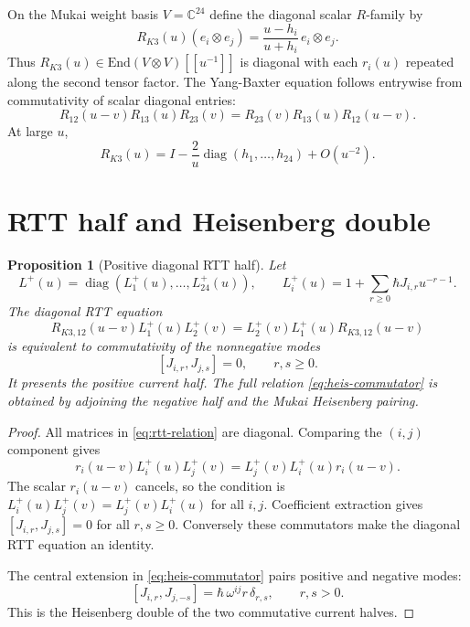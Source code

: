 \documentclass[11pt]{article}
\newtheorem{proposition}[theorem]{Proposition}
\theoremstyle{definition}
\newcommand{\C}{\mathbb{C}}
\newcommand{\End}{\mathrm{End}}
\begin{document}
On the Mukai weight basis $V=\C^{24}$ define the diagonal scalar
$R$-family by
\begin{equation}
\label{eq:r-matrix-diagonal}
  R_{K3}(u)(e_i\otimes e_j)
  =
  \frac{u-h_i}{u+h_i}\,e_i\otimes e_j.
\end{equation}
Thus $R_{K3}(u)\in\End(V\otimes V)[[u^{-1}]]$ is diagonal with each
$r_i(u)$ repeated along the second tensor factor. The Yang-Baxter
equation follows entrywise from commutativity of scalar diagonal entries:
\[
  R_{12}(u-v)R_{13}(u)R_{23}(v)
  =
  R_{23}(v)R_{13}(u)R_{12}(u-v).
\]
At large $u$,
\begin{equation}
\label{eq:classical-r-mukai-note}
  R_{K3}(u)=I-\frac{2}{u}\operatorname{diag}(h_1,\ldots,h_{24})+O(u^{-2}).
\end{equation}

\section{RTT half and Heisenberg double}
\label{sec:rtt-half}

\begin{proposition}[Positive diagonal RTT half]
\label{prop:rtt-positive-half}
Let
\[
  L^+(u)=\operatorname{diag}(L^+_1(u),\ldots,L^+_{24}(u)),
  \qquad
  L^+_i(u)=1+\sum_{r\geq0}\hbar J_{i,r}u^{-r-1}.
\]
The diagonal RTT equation
\begin{equation}
\label{eq:rtt-relation}
  R_{K3,12}(u-v)L^+_1(u)L^+_2(v)
  =
  L^+_2(v)L^+_1(u)R_{K3,12}(u-v)
\end{equation}
is equivalent to commutativity of the nonnegative modes
\[
  [J_{i,r},J_{j,s}]=0,\qquad r,s\geq0.
\]
It presents the positive current half. The full relation
\eqref{eq:heis-commutator} is obtained by adjoining the negative half and
the Mukai Heisenberg pairing.
\end{proposition}

\begin{proof}
All matrices in \eqref{eq:rtt-relation} are diagonal. Comparing the
$(i,j)$ component gives
\[
  r_i(u-v)L^+_i(u)L^+_j(v)
  =
  L^+_j(v)L^+_i(u)r_i(u-v).
\]
The scalar $r_i(u-v)$ cancels, so the condition is
$L^+_i(u)L^+_j(v)=L^+_j(v)L^+_i(u)$ for all $i,j$. Coefficient extraction
gives $[J_{i,r},J_{j,s}]=0$ for all $r,s\geq0$. Conversely these
commutators make the diagonal RTT equation an identity.

The central extension in \eqref{eq:heis-commutator} pairs positive and
negative modes:
\[
  [J_{i,r},J_{j,-s}]
  =
  \hbar\,\omega^{ij}r\,\delta_{r,s},
  \qquad r,s>0.
\]
This is the Heisenberg double of the two commutative current halves.
\end{proof}
\end{document}
